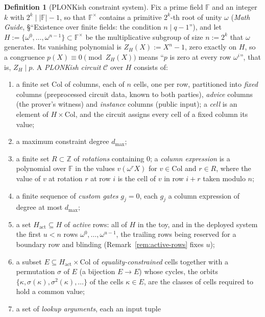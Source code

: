 \documentclass[11pt,a4paper]{article}
\theoremstyle{definition}
\newtheorem{definition}[theorem]{Definition}
\newcommand{\F}{\mathbb{F}}
\newcommand{\Z}{\mathbb{Z}}
\newcommand{\ZH}{Z_H}
\begin{document}
\begin{definition}[PLONKish constraint system]\label{def:plonkish}
Fix a prime field $\F$ and an integer $k$ with $2^k \mid |\F| - 1$, so
that $\F^\times$ contains a primitive $2^k$-th root of unity $\omega$
(\emph{Math Guide}, \S``Existence over finite fields: the condition
$n \mid q-1$''), and let
$H := \{\omega^0, \dots, \omega^{n-1}\} \subset \F^\times$ be the
multiplicative subgroup of size $n := 2^k$ that $\omega$ generates. Its
vanishing polynomial is $\ZH(X) := X^n - 1$, zero exactly on $H$, so a
congruence $p(X) \equiv 0 \pmod{\ZH(X)}$ means ``$p$ is zero at every
row $\omega^i$'', that is, $\ZH \mid p$. A \emph{PLONKish circuit}
$\mathcal C$ over $H$ consists of:
\begin{enumerate}[leftmargin=*, itemsep=1pt]
\item a finite set $\mathrm{Col}$ of columns, each of $n$ cells, one per
  row, partitioned into \emph{fixed} columns (preprocessed circuit data,
  known to both parties), \emph{advice} columns (the prover's witness)
  and \emph{instance} columns (public input); a \emph{cell} is an element
  of $H \times \mathrm{Col}$, and the circuit assigns every cell of a
  fixed column its value;
\item a maximum constraint degree $d_{\max}$;
\item a finite set $R \subset \Z$ of \emph{rotations} containing $0$; a
  \emph{column expression} is a polynomial over $\F$ in the values
  $v(\omega^r X)$ for $v \in \mathrm{Col}$ and $r \in R$, where the value
  of $v$ at rotation $r$ at row $i$ is the cell of $v$ in row $i + r$
  taken modulo $n$;
\item a finite sequence of \emph{custom gates} $g_j = 0$, each $g_j$ a
  column expression of degree at most $d_{\max}$;
\item a set $H_{\mathrm{act}} \subseteq H$ of \emph{active} rows: all of
  $H$ in the toy, and in the deployed system the first $u < n$ rows
  $\omega^0, \dots, \omega^{u-1}$, the trailing rows being reserved for a
  boundary row and blinding (Remark~\ref{rem:active-rows} fixes $u$);
\item a subset $E \subseteq H_{\mathrm{act}} \times \mathrm{Col}$ of
  \emph{equality-constrained} cells together with a permutation $\sigma$
  of $E$ (a bijection $E \to E$) whose cycles, the orbits
  $\{\kappa, \sigma(\kappa), \sigma^2(\kappa), \dots\}$ of the cells
  $\kappa \in E$, are the classes of cells required to hold a common
  value;
\item a set of \emph{lookup arguments}, each an input tuple

\end{enumerate}
\end{definition}
\end{document}
